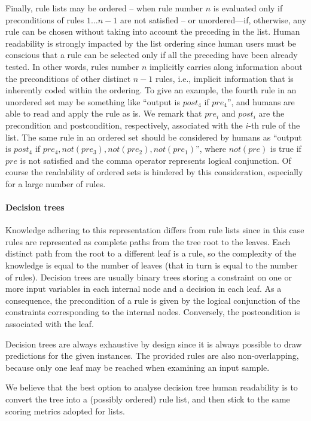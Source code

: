 \documentclass[sigconf]{acmart}
\begin{document}
Finally, rule lists may be ordered -- when rule number $n$ is evaluated only if preconditions of rules $1 \dots n-1$ are not satisfied -- or unordered---if, otherwise, any rule can be chosen without taking into account the preceding in the list.
%
Human readability is strongly impacted by the list ordering since human users must be conscious that a rule can be selected only if all the preceding have been already tested.
%
In other words, rules number $n$ implicitly carries along information about the preconditions of other distinct $n-1$ rules, i.e., implicit information that is inherently coded within the ordering.
%
To give an example, the fourth rule in an unordered set may be something like ``output is $post_4$ if $pre_4$'', and humans are able to read and apply the rule as is.
%
We remark that $pre_i$ and $post_i$ are the precondition and postcondition, respectively, associated with the $i$-th rule of the list.
%
The same rule in an ordered set should be considered by humans as ``output is $post_4$ if $pre_4, not(pre_3), not(pre_2), not(pre_1)$'', where $not(pre)$ is true if $pre$ is not satisfied and the comma operator represents logical conjunction.
%
Of course the readability of ordered sets is hindered by this consideration, especially for a large number of rules.

\paragraph{Decision trees}

Knowledge adhering to this representation differs from rule lists since in this case rules are represented as complete paths from the tree root to the leaves.
%
Each distinct path from the root to a different leaf is a rule, so the complexity of the knowledge is equal to the number of leaves (that in turn is equal to the number of rules).
%
Decision trees are usually binary trees storing a constraint on one or more input variables in each internal node and a decision in each leaf.
%
As a consequence, the precondition of a rule is given by the logical conjunction of the constraints corresponding to the internal nodes.
%
Conversely, the postcondition is associated with the leaf.

Decision trees are always exhaustive by design since it is always possible to draw predictions for the given instances.
%
The provided rules are also non-overlapping, because only one leaf may be reached when examining an input sample.

We believe that the best option to analyse decision tree human readability is to convert the tree into a (possibly ordered) rule list, and then stick to the same scoring metrics adopted for lists.
\end{document}
